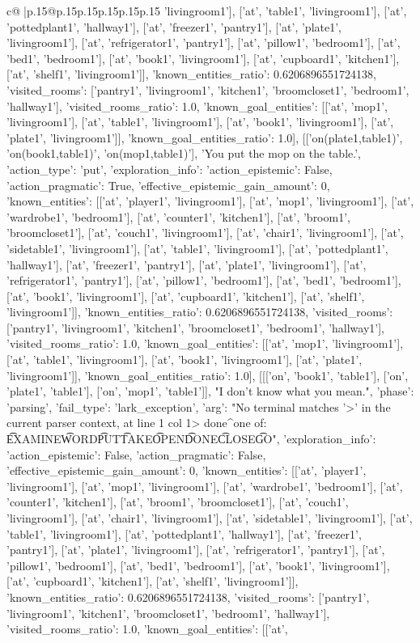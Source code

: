 \documentclass{article}
\begin{document}
{\begin{supertabular}{c@{$\;$}|p{.15\linewidth}@{}p{.15\linewidth}p{.15\linewidth}p{.15\linewidth}p{.15\linewidth}p{.15\linewidth}}
{{{'livingroom1'], ['at', 'table1', 'livingroom1'], ['at', 'pottedplant1', 'hallway1'], ['at', 'freezer1', 'pantry1'], ['at', 'plate1', 'livingroom1'], ['at', 'refrigerator1', 'pantry1'], ['at', 'pillow1', 'bedroom1'], ['at', 'bed1', 'bedroom1'], ['at', 'book1', 'livingroom1'], ['at', 'cupboard1', 'kitchen1'], ['at', 'shelf1', 'livingroom1']], 'known_entities_ratio': 0.6206896551724138, 'visited_rooms': ['pantry1', 'livingroom1', 'kitchen1', 'broomcloset1', 'bedroom1', 'hallway1'], 'visited_rooms_ratio': 1.0, 'known_goal_entities': [['at', 'mop1', 'livingroom1'], ['at', 'table1', 'livingroom1'], ['at', 'book1', 'livingroom1'], ['at', 'plate1', 'livingroom1']], 'known_goal_entities_ratio': 1.0}}], [['on(plate1,table1)', 'on(book1,table1)', 'on(mop1,table1)'], 'You put the mop on the table.', {'action_type': 'put', 'exploration_info': {'action_epistemic': False, 'action_pragmatic': True, 'effective_epistemic_gain_amount': 0, 'known_entities': [['at', 'player1', 'livingroom1'], ['at', 'mop1', 'livingroom1'], ['at', 'wardrobe1', 'bedroom1'], ['at', 'counter1', 'kitchen1'], ['at', 'broom1', 'broomcloset1'], ['at', 'couch1', 'livingroom1'], ['at', 'chair1', 'livingroom1'], ['at', 'sidetable1', 'livingroom1'], ['at', 'table1', 'livingroom1'], ['at', 'pottedplant1', 'hallway1'], ['at', 'freezer1', 'pantry1'], ['at', 'plate1', 'livingroom1'], ['at', 'refrigerator1', 'pantry1'], ['at', 'pillow1', 'bedroom1'], ['at', 'bed1', 'bedroom1'], ['at', 'book1', 'livingroom1'], ['at', 'cupboard1', 'kitchen1'], ['at', 'shelf1', 'livingroom1']], 'known_entities_ratio': 0.6206896551724138, 'visited_rooms': ['pantry1', 'livingroom1', 'kitchen1', 'broomcloset1', 'bedroom1', 'hallway1'], 'visited_rooms_ratio': 1.0, 'known_goal_entities': [['at', 'mop1', 'livingroom1'], ['at', 'table1', 'livingroom1'], ['at', 'book1', 'livingroom1'], ['at', 'plate1', 'livingroom1']], 'known_goal_entities_ratio': 1.0}}], [[['on', 'book1', 'table1'], ['on', 'plate1', 'table1'], ['on', 'mop1', 'table1']], "I don't know what you mean.", {'phase': 'parsing', 'fail_type': 'lark_exception', 'arg': "No terminal matches '>' in the current parser context, at line 1 col 1\n\n> done\n^\nExpected one of: \n\t* EXAMINE\n\t* WORD\n\t* PUT\n\t* TAKE\n\t* OPEN\n\t* DONE\n\t* CLOSE\n\t* GO\n", 'exploration_info': {'action_epistemic': False, 'action_pragmatic': False, 'effective_epistemic_gain_amount': 0, 'known_entities': [['at', 'player1', 'livingroom1'], ['at', 'mop1', 'livingroom1'], ['at', 'wardrobe1', 'bedroom1'], ['at', 'counter1', 'kitchen1'], ['at', 'broom1', 'broomcloset1'], ['at', 'couch1', 'livingroom1'], ['at', 'chair1', 'livingroom1'], ['at', 'sidetable1', 'livingroom1'], ['at', 'table1', 'livingroom1'], ['at', 'pottedplant1', 'hallway1'], ['at', 'freezer1', 'pantry1'], ['at', 'plate1', 'livingroom1'], ['at', 'refrigerator1', 'pantry1'], ['at', 'pillow1', 'bedroom1'], ['at', 'bed1', 'bedroom1'], ['at', 'book1', 'livingroom1'], ['at', 'cupboard1', 'kitchen1'], ['at', 'shelf1', 'livingroom1']], 'known_entities_ratio': 0.6206896551724138, 'visited_rooms': ['pantry1', 'livingroom1', 'kitchen1', 'broomcloset1', 'bedroom1', 'hallway1'], 'visited_rooms_ratio': 1.0, 'known_goal_entities': [['at', }}}
\end{supertabular}}
\end{document}
